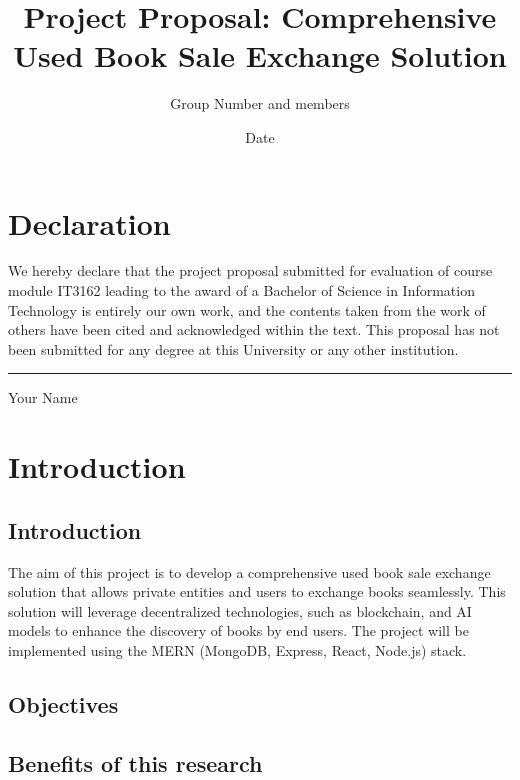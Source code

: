 \documentclass{article}
\begin{document}
\title{Project Proposal: Comprehensive Used Book Sale Exchange Solution}
\author{Group Number and members}
\date{Date}
\maketitle

\newpage

\section*{Declaration}
We hereby declare that the project proposal submitted for evaluation of
course module IT3162 leading to the award of a Bachelor of Science in
Information Technology is entirely our own work, and the contents taken from
the work of others have been cited and acknowledged within the text. This
proposal has not been submitted for any degree at this University or any other
institution.

\vspace{2cm} %
\rule{5cm}{0.5pt} %
\linebreak
Your Name

\newpage

\tableofcontents
\newpage

\section{Introduction}
\subsection{Introduction}
The aim of this project is to develop a comprehensive used book sale exchange
solution that allows private entities and users to exchange books seamlessly.
This solution will leverage decentralized technologies, such as blockchain, and
AI models to enhance the discovery of books by end users. The project will be
implemented using the MERN (MongoDB, Express, React, Node.js) stack.

\subsection{Objectives}


\subsection{Benefits of this research}

\end{document}
